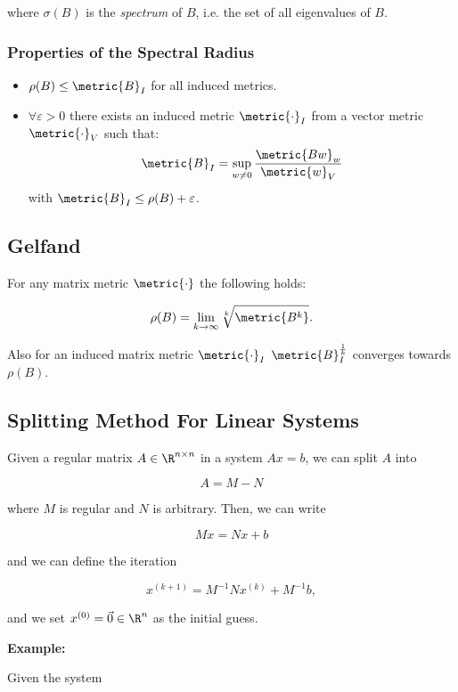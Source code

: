 where \(\sigma(B)\) is the \emph{spectrum} of \(B\), i.e. the set of all eigenvalues of \(B\).

\subsubsection*{Properties of the Spectral Radius}

\begin{itemize}

    \item \(\rho(B) \le \metric{B}_I\) for all induced metrics.

    \item \(\forall \varepsilon > 0\) there exists an induced metric \(\metric{\cdot}_I\) from a vector metric \(\metric{\cdot}_V\) such that:
    \[
        \metric{B}_I = \sup_{w \ne 0} \frac{\metric{Bw}_w}{\metric{w}_V}
    \]
    with \(\metric{B}_I \le \rho(B) + \varepsilon\).

\end{itemize}

\subsection{Gelfand}

For any matrix metric \(\metric{\cdot}\) the following holds:

\[
    \rho(B) = \lim_{k \to \infty} \sqrt[k]{\metric{B^k}}.
\]

Also for an induced matrix metric \(\metric{\cdot}_I\) \(\metric{B}_I^{\frac{1}{k}}\) converges towards \(\rho(B)\).
\subsection{Splitting Method For Linear Systems}

Given a regular matrix \(A \in \R^{n \times n}\) in a system \(Ax = b\), we can split \(A\) into 

\[
    A = M - N
\]

where \(M\) is regular and \(N\) is arbitrary. Then, we can write

\[
    Mx = Nx + b
\]

and we can define the iteration 

\[
    x^{(k + 1)} = M^{-1}Nx^{(k)} + M^{-1}b,
\]

and we set \(x^{(0)} = \vec{0} \in \R^n\) as the initial guess.

\textbf{Example:}

Given the system 

